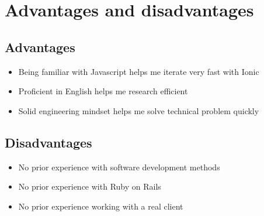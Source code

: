 \chapter{Advantages and disadvantages}
\section{Advantages}
\begin{itemize}
\item{Being familiar with Javascript helps me iterate very fast with Ionic}
\item{Proficient in English helps me research efficient}
\item{Solid engineering mindset helps me solve technical problem quickly}
\end{itemize}
\section{Disadvantages}
\begin{itemize}
\item{No prior experience with software development methods}
\item{No prior experience with Ruby on Rails}
\item{No prior experience working with a real client}
\end{itemize}